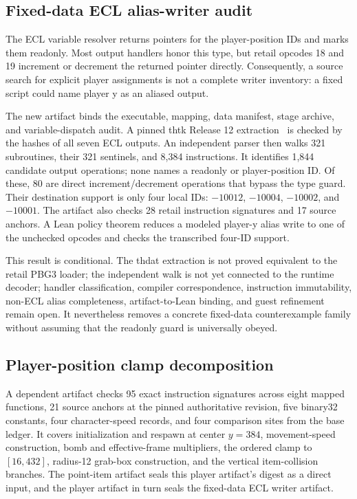 \subsection{Fixed-data ECL alias-writer audit}

The ECL variable resolver returns pointers for the player-position IDs and
marks them readonly.  Most output handlers honor this type, but retail opcodes
18 and 19 increment or decrement the returned pointer directly.  Consequently,
a source search for explicit player assignments is not a complete writer
inventory: a fixed script could name player y as an aliased output.

The new artifact binds the executable, mapping, data manifest, stage archive,
and variable-dispatch audit.  A pinned thtk Release 12 extraction~\cite{thtk}
is checked by the hashes of all seven ECL outputs.  An independent parser then
walks 321 subroutines, their 321 sentinels, and 8,384 instructions.  It
identifies 1,844 candidate output operations; none names a readonly or
player-position ID.  Of
these, 80 are direct increment/decrement operations that bypass the type guard.
Their destination support is only four local IDs: $-10012$, $-10004$,
$-10002$, and $-10001$.  The artifact also checks 28 retail instruction
signatures and 17 source anchors.  A Lean policy theorem reduces a modeled
player-y alias write to one of the unchecked opcodes and checks the transcribed
four-ID support.

This result is conditional.  The thdat extraction is not proved equivalent to
the retail PBG3 loader; the independent walk is not yet connected to the
runtime decoder; handler classification, compiler correspondence, instruction
immutability, non-ECL alias completeness, artifact-to-Lean binding, and guest
refinement remain open.  It nevertheless removes a concrete fixed-data
counterexample family without assuming that the readonly guard is universally
obeyed.

\subsection{Player-position clamp decomposition}

A dependent artifact checks 95 exact instruction signatures across eight
mapped functions, 21 source anchors at the pinned authoritative revision, five
binary32 constants, four character-speed records, and four comparison sites
from the base ledger.  It covers initialization and respawn at center
$y=384$, movement-speed construction, bomb and effective-frame multipliers,
the ordered clamp to $[16,432]$, radius-12 grab-box construction, and the
vertical item-collision branches.  The point-item artifact seals this player
artifact's digest as a direct input, and the player artifact in turn seals the
fixed-data ECL writer artifact.

